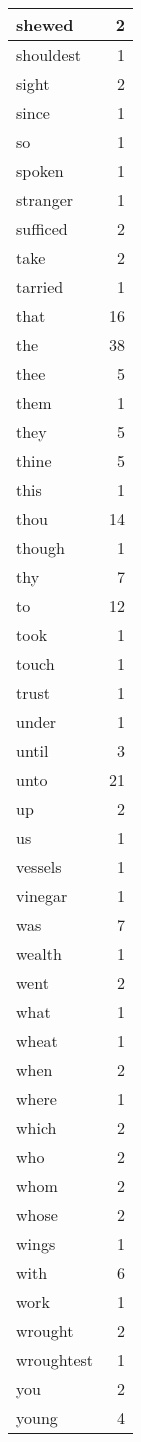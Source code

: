 \begin{center}
\begin{longtable}{l|r}
shewed & 2 \\ \hline
shouldest & 1 \\ \hline
sight & 2 \\ \hline
since & 1 \\ \hline
so & 1 \\ \hline
spoken & 1 \\ \hline
stranger & 1 \\ \hline
sufficed & 2 \\ \hline
take & 2 \\ \hline
tarried & 1 \\ \hline
that & 16 \\ \hline
the & 38 \\ \hline
thee & 5 \\ \hline
them & 1 \\ \hline
they & 5 \\ \hline
thine & 5 \\ \hline
this & 1 \\ \hline
thou & 14 \\ \hline
though & 1 \\ \hline
thy & 7 \\ \hline
to & 12 \\ \hline
took & 1 \\ \hline
touch & 1 \\ \hline
trust & 1 \\ \hline
under & 1 \\ \hline
until & 3 \\ \hline
unto & 21 \\ \hline
up & 2 \\ \hline
us & 1 \\ \hline
vessels & 1 \\ \hline
vinegar & 1 \\ \hline
was & 7 \\ \hline
wealth & 1 \\ \hline
went & 2 \\ \hline
what & 1 \\ \hline
wheat & 1 \\ \hline
when & 2 \\ \hline
where & 1 \\ \hline
which & 2 \\ \hline
who & 2 \\ \hline
whom & 2 \\ \hline
whose & 2 \\ \hline
wings & 1 \\ \hline
with & 6 \\ \hline
work & 1 \\ \hline
wrought & 2 \\ \hline
wroughtest & 1 \\ \hline
you & 2 \\ \hline
young & 4 \\ \hline
\end{longtable}
\end{center}



